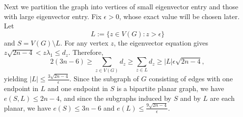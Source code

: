 
Next we partition the graph into vertices of small eigenvector entry and those with large eigenvector entry.  Fix $\epsilon > 0$,
whose exact value will be chosen later.  Let 
\[
L:= \{z\in V(G): z> \epsilon\}
\]
and $S = V(G) \setminus L$. For any vertex $z$, the eigenvector equation gives $z\sqrt{2n-4} < z\lambda_1\leq d_z$. Therefore,
\[
2(3n - 6)  \geq \sum_{z\in V(G)} d_z \geq \sum_{z\in L} d_z \geq |L|\epsilon \sqrt{2n-4},
\]
yielding $|L| \leq \frac{3\sqrt{2n-4}}{\epsilon}$. Since the subgraph of $G$ consisting of edges with one endpoint in $L$ and one endpoint in $S$ is a bipartite planar graph, we have $e(S,L) \leq 2n-4$, and since the subgraphs induced by $S$ and by $L$ are each planar, we have $e(S) \leq 3n-6$ and $e(L) \leq \frac{9\sqrt{2n-4}}{\epsilon}$. 


